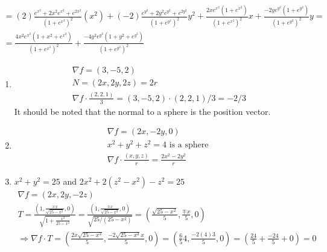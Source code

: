 \documentclass[twoside]{amsart}
\theoremstyle{plain}
\theoremstyle{definition}
\newcommand{\exercisehead}[1]
  {
   \noindent{\small\bf Exercise #1.}
   \smallskip}
\begin{document}
\begin{enumerate}
\begin{multline*}
  = (2) \frac{ e^{x^2} + 2x^2 e^{x^2 } + e^{2x^2 } }{ (1+e^{x^2})^2 } (x^2 ) + (-2) \frac{ e^{y^2 } + 2y^2 e^{y^2 } + e^{2y^2 } }{ (1+e^{y^2} )^2 } y^2 + \frac{ 2x e^{x^2 }(1+e^{x^2 }) }{ (1+e^{x^2 })^2 } x + \frac{ -2y e^{y^2} ( 1 + e^{y^2 }) }{ ( 1 + e^{y^2 })^2 } y = \\
  = \boxed{ \frac{ 4x^2 e^{x^2 } ( 1 + x^2 + e^{x^2 } ) }{ (1+e^{x^2})^2 } + \frac{ -4 y^2 e^{y^2} ( 1 + y^2 + e^{y^2} ) }{ (1+e^{y^2})^2 }  }
\end{multline*}
\end{enumerate}

\exercisehead{3}
\begin{enumerate}
\item 
\[
\begin{gathered}
  \nabla f = (3,-5,2) \\
  N = (2x, 2y, 2z) = 2r \\
  \nabla f \cdot \frac{ (2,2,1) }{3 } = (3,-5,2) \cdot (2,2,1)/3 = \boxed{ -2/3} 
\end{gathered}
\]
It should be noted that the normal to a sphere is the position vector.  
\item \[
\begin{gathered}
  \nabla f = (2x,-2y,0) \\
  x^2 + y^2 + z^2 = 4 \text{ is a sphere } \\
  \nabla f \cdot \frac{ (x,y,z)}{r} = \frac{2x^2  -2y^2 }{r}
\end{gathered}
\]
\item $x^2 + y^2 = 25$ and $2x^2 + 2(z^2 - x^2) - z^2 = 25$
\[
\begin{gathered}
  \nabla f = (2x,2y,-2z) \\
  T = \frac{ (1, \frac{ \mp x }{ \sqrt{ 25 - x^2 } }, 0  ) }{ \sqrt{ 1 + \frac{ x^2 }{ 25 - x^2 } } } = \frac{ \left( 1 , \frac{ \mp x }{ \sqrt{ 25 - x^2 } }, 0 \right) }{ \sqrt{ 25 /(25-x^2 ) } } = \left( \frac{ \sqrt{ 25 - x^2 }}{5} , \frac{ \mp x }{ 5}, 0 \right) \\
  \Longrightarrow \nabla f \cdot T = \left( \frac{ 2x \sqrt{ 25 - x^2 }}{5} , \frac{ -2 \sqrt{ 25 -x^2 } x }{5 }, 0 \right) = \left( \frac{ 6 }{5} 4 , \frac{ -2 (4) 3 }{ 5 }, 0 \right) = \left( \frac{ 24}{5} + \frac{-24}{5} + 0 \right) =0 
\end{gathered}
\]
\end{enumerate}
\end{document}
